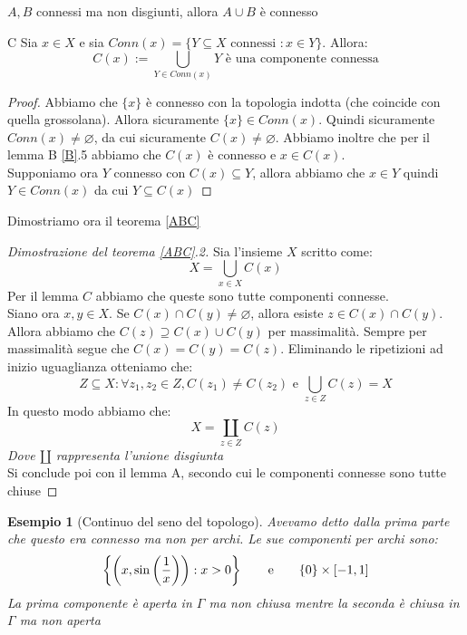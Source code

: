 \documentclass[11pt,a4paper,twoside]{article}
\newtheorem{es}{Esempio}
\theoremstyle{definition}
\begin{document}
\begin{cor}{}{}
	$A,B$ connessi ma non disgiunti, allora $A \cup B$ è connesso
\end{cor}

\begin{lemma}{C}{}
	Sia $x \in X$ e sia $Conn(x) = \{Y\subseteq X\text{ connessi }:x \in Y\}$. Allora:
	\[ C(x):= \bigcup_{Y \in Conn(x)} Y \text{ è una componente connessa} \]
\end{lemma}
\begin{proof}
	Abbiamo che $\{x\}$ è connesso con la topologia indotta (che coincide con quella grossolana). Allora sicuramente $\{x\}\in Conn(x)$. Quindi sicuramente $Conn(x)\neq \varnothing$, da cui sicuramente $C(x)\neq \varnothing$. Abbiamo inoltre che per il lemma B \ref{B}.5 abbiamo che $C(x)$ è connesso e $x \in C(x)$.\\
	Supponiamo ora $Y$ connesso con $C(x)\subseteq Y$, allora abbiamo che $x \in Y$ quindi $Y \in Conn(x)$ da cui $Y \subseteq C(x)$
\end{proof}

Dimostriamo ora il teorema \ref{ABC}

\begin{proof}[Dimostrazione del teorema \ref{ABC}.2]
	Sia l'insieme $X$ scritto come:
	\[ X = \bigcup_{x \in X}C(x) \]
	Per il lemma $C$ abbiamo che queste sono tutte componenti connesse.\\
	Siano ora $x, y \in X$. Se $C(x)\cap C(y) \neq \varnothing$, allora esiste $z \in C(x) \cap C(y)$. Allora abbiamo che $C(z)\supseteq C(x)\cup C(y)$ per massimalità. Sempre per massimalità segue che $C(x) = C(y) = C(z)$. Eliminando le ripetizioni ad inizio uguaglianza otteniamo che:
	\[ Z \subseteq X: \forall z_1, z_2 \in Z, C(z_1)\neq C(z_2) \text{ e } \bigcup_{z \in Z}C(z) = X \]
	In questo modo abbiamo che:
	\[ X = \coprod_{z \in Z}C(z)\]
	\textit{Dove $\amalg$ rappresenta l'unione disgiunta}\\
	Si conclude poi con il lemma A, secondo cui le componenti connesse sono tutte chiuse
\end{proof}

\begin{es}[Continuo del seno del topologo]
	Avevamo detto dalla prima parte che questo era connesso ma non per archi. Le sue componenti per archi sono:
	\[ \left\{ \left( x, \sin \left(\frac 1x\right) \right): x>0 \right\} \qquad \text e\qquad \{0\}\times [-1,1] \]
	La prima componente è aperta in $\Gamma$ ma non chiusa mentre la seconda è chiusa in $\Gamma$ ma non aperta
\end{es}
\end{document}
